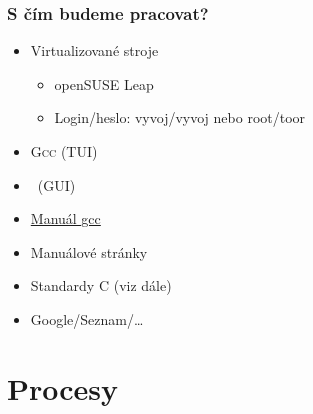 \begin{frame}
  \frametitle{S čím budeme pracovat?}

  \begin{itemize}
    \item Virtualizované stroje
    \begin{itemize}
      \item openSUSE Leap
      \item Login/heslo: vyvoj/vyvoj nebo root/toor
    \end{itemize}
  \end{itemize}

  \pause
  \medskip

  \begin{itemize}
    \item \textsc{Gcc} (TUI)
    \item \qtc\ (GUI)
  \end{itemize}

  \pause
  \medskip

  \begin{itemize}
    \item \href{https://gcc.gnu.org/onlinedocs/}{Manuál gcc}
    \item Manuálové stránky
    \item Standardy C (viz dále)

    \pause

    \item Google/Seznam/\dots
  \end{itemize}

\end{frame}

\fi

\section{Procesy}
\frame{\sectionpage}



